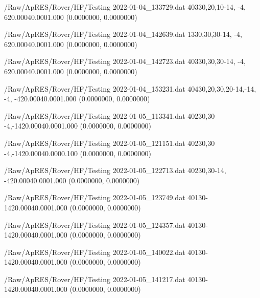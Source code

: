 \hfaprestable
{/Raw/ApRES/Rover/HF/Testing}%
{2022-01-04\_133729.dat}%
{40}{3}{30,20,10}{-14, -4,  6}{20.000}{40.000}{1.000}%
{ (0.0000000, 0.0000000)}%
{}%
{}%

\hfaprestable
{/Raw/ApRES/Rover/HF/Testing}%
{2022-01-04\_142639.dat}%
{1}{3}{30,30,30}{-14, -4,  6}{20.000}{40.000}{1.000}%
{ (0.0000000, 0.0000000)}%
{}%
{}%

\hfaprestable
{/Raw/ApRES/Rover/HF/Testing}%
{2022-01-04\_142723.dat}%
{40}{3}{30,30,30}{-14, -4,  6}{20.000}{40.000}{1.000}%
{ (0.0000000, 0.0000000)}%
{}%
{}%

\hfaprestable
{/Raw/ApRES/Rover/HF/Testing}%
{2022-01-04\_153231.dat}%
{40}{4}{30,20,30,20}{-14,-14, -4, -4}{20.000}{40.000}{1.000}%
{ (0.0000000, 0.0000000)}%
{}%
{}%

\hfaprestable
{/Raw/ApRES/Rover/HF/Testing}%
{2022-01-05\_113341.dat}%
{40}{2}{30,30}{ -4,-14}{20.000}{40.000}{1.000}%
{ (0.0000000, 0.0000000)}%
{}%
{}%

\hfaprestable
{/Raw/ApRES/Rover/HF/Testing}%
{2022-01-05\_121151.dat}%
{40}{2}{30,30}{ -4,-14}{20.000}{40.000}{0.100}%
{ (0.0000000, 0.0000000)}%
{}%
{}%

\hfaprestable
{/Raw/ApRES/Rover/HF/Testing}%
{2022-01-05\_122713.dat}%
{40}{2}{30,30}{-14, -4}{20.000}{40.000}{1.000}%
{ (0.0000000, 0.0000000)}%
{}%
{}%

\hfaprestable
{/Raw/ApRES/Rover/HF/Testing}%
{2022-01-05\_123749.dat}%
{40}{1}{30}{-14}{20.000}{40.000}{1.000}%
{ (0.0000000, 0.0000000)}%
{}%
{}%

\hfaprestable
{/Raw/ApRES/Rover/HF/Testing}%
{2022-01-05\_124357.dat}%
{40}{1}{30}{-14}{20.000}{40.000}{1.000}%
{ (0.0000000, 0.0000000)}%
{}%
{}%

\hfaprestable
{/Raw/ApRES/Rover/HF/Testing}%
{2022-01-05\_140022.dat}%
{40}{1}{30}{-14}{20.000}{40.000}{1.000}%
{ (0.0000000, 0.0000000)}%
{}%
{}%

\hfaprestable
{/Raw/ApRES/Rover/HF/Testing}%
{2022-01-05\_141217.dat}%
{40}{1}{30}{-14}{20.000}{40.000}{1.000}%
{ (0.0000000, 0.0000000)}%
{}%
{}%

